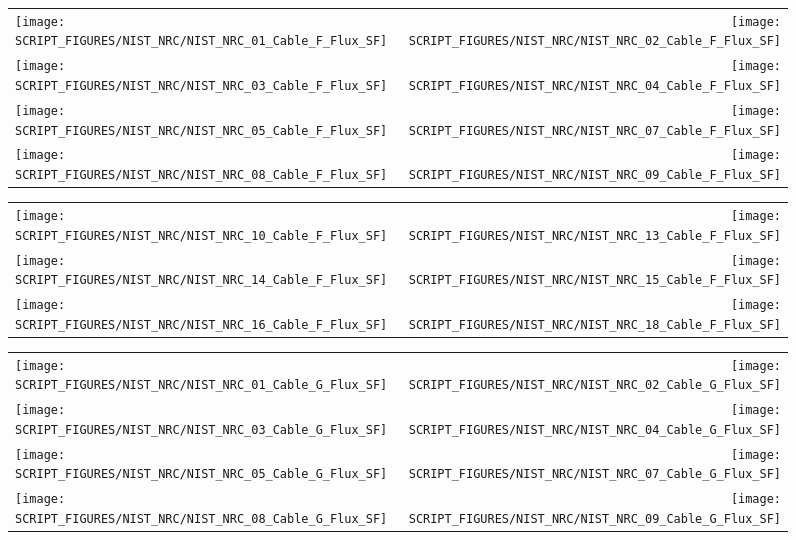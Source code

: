 \begin{figure}[!ht]
\begin{tabular*}{\textwidth}{l@{\extracolsep{\fill}}r}
\texttt{[image: SCRIPT\_FIGURES/NIST\_NRC/NIST\_NRC\_01\_Cable\_F\_Flux\_SF]} &
\texttt{[image: SCRIPT\_FIGURES/NIST\_NRC/NIST\_NRC\_02\_Cable\_F\_Flux\_SF]} \\
\texttt{[image: SCRIPT\_FIGURES/NIST\_NRC/NIST\_NRC\_03\_Cable\_F\_Flux\_SF]} &
\texttt{[image: SCRIPT\_FIGURES/NIST\_NRC/NIST\_NRC\_04\_Cable\_F\_Flux\_SF]} \\
\texttt{[image: SCRIPT\_FIGURES/NIST\_NRC/NIST\_NRC\_05\_Cable\_F\_Flux\_SF]} &
\texttt{[image: SCRIPT\_FIGURES/NIST\_NRC/NIST\_NRC\_07\_Cable\_F\_Flux\_SF]} \\
\texttt{[image: SCRIPT\_FIGURES/NIST\_NRC/NIST\_NRC\_08\_Cable\_F\_Flux\_SF]} &
\texttt{[image: SCRIPT\_FIGURES/NIST\_NRC/NIST\_NRC\_09\_Cable\_F\_Flux\_SF]}
\end{tabular*}
\end{figure}

\begin{figure}[!ht]
\begin{tabular*}{\textwidth}{l@{\extracolsep{\fill}}r}
\texttt{[image: SCRIPT\_FIGURES/NIST\_NRC/NIST\_NRC\_10\_Cable\_F\_Flux\_SF]} &
\texttt{[image: SCRIPT\_FIGURES/NIST\_NRC/NIST\_NRC\_13\_Cable\_F\_Flux\_SF]} \\
\texttt{[image: SCRIPT\_FIGURES/NIST\_NRC/NIST\_NRC\_14\_Cable\_F\_Flux\_SF]} &
\texttt{[image: SCRIPT\_FIGURES/NIST\_NRC/NIST\_NRC\_15\_Cable\_F\_Flux\_SF]} \\
\texttt{[image: SCRIPT\_FIGURES/NIST\_NRC/NIST\_NRC\_16\_Cable\_F\_Flux\_SF]} &
\texttt{[image: SCRIPT\_FIGURES/NIST\_NRC/NIST\_NRC\_18\_Cable\_F\_Flux\_SF]}
\end{tabular*}
\end{figure}

\begin{figure}[!ht]
\begin{tabular*}{\textwidth}{l@{\extracolsep{\fill}}r}
\texttt{[image: SCRIPT\_FIGURES/NIST\_NRC/NIST\_NRC\_01\_Cable\_G\_Flux\_SF]} &
\texttt{[image: SCRIPT\_FIGURES/NIST\_NRC/NIST\_NRC\_02\_Cable\_G\_Flux\_SF]} \\
\texttt{[image: SCRIPT\_FIGURES/NIST\_NRC/NIST\_NRC\_03\_Cable\_G\_Flux\_SF]} &
\texttt{[image: SCRIPT\_FIGURES/NIST\_NRC/NIST\_NRC\_04\_Cable\_G\_Flux\_SF]} \\
\texttt{[image: SCRIPT\_FIGURES/NIST\_NRC/NIST\_NRC\_05\_Cable\_G\_Flux\_SF]} &
\texttt{[image: SCRIPT\_FIGURES/NIST\_NRC/NIST\_NRC\_07\_Cable\_G\_Flux\_SF]} \\
\texttt{[image: SCRIPT\_FIGURES/NIST\_NRC/NIST\_NRC\_08\_Cable\_G\_Flux\_SF]} &
\texttt{[image: SCRIPT\_FIGURES/NIST\_NRC/NIST\_NRC\_09\_Cable\_G\_Flux\_SF]}
\end{tabular*}
\end{figure}

